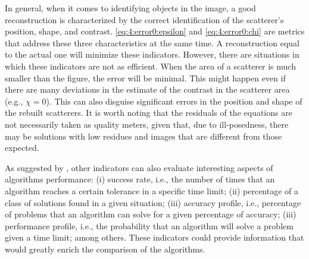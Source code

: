 		In general, when it comes to identifying objects in the image, a good reconstruction is characterized by the correct identification of the scatterer's position, shape, and contrast. \eqref{eq:4:error0:epsilon} and \eqref{eq:4:error0:chi} are metrics that address these three characteristics at the same time. A reconstruction equal to the actual one will minimize these indicators. However, there are situations in which these indicators are not as efficient. When the area of a scatterer is much smaller than the figure, the error will be minimal. This might happen even if there are many deviations in the estimate of the contrast in the scatterer area (e.g., $\chi=0$). This can also disguise significant errors in the position and shape of the rebuilt scatterers. It is worth noting that the residuals of the equations are not necessarily taken as quality meters, given that, due to ill-posedness, there may be solutions with low residues and images that are different from those expected.
		
		As suggested by \cite{beiranvand2017best}, other indicators can also evaluate interesting aspects of algorithms performance: (i) success rate, i.e., the number of times that an algorithm reaches a certain tolerance in a specific time limit; (ii) percentage of a class of solutions found in a given situation; (iii) accuracy profile, i.e., percentage of problems that an algorithm can solve for a given percentage of accuracy; (iii) performance profile, i.e., the probability that an algorithm will solve a problem given a time limit; among others. These indicators could provide information that would greatly enrich the comparison of the algorithms.
	

